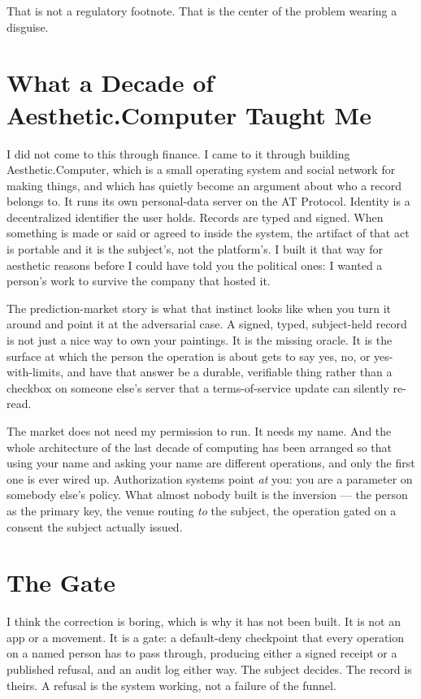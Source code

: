 \documentclass[11pt,letterpaper]{article}
\newcommand{\ac}{Aesthetic\textcolor{acpink}{.}Computer}
\begin{document}
That is not a regulatory footnote. That is the center of the problem wearing a disguise.

\section{What a Decade of \ac{} Taught Me}

I did not come to this through finance. I came to it through building \ac{}, which is a small operating system and social network for making things, and which has quietly become an argument about who a record belongs to. It runs its own personal-data server on the AT Protocol. Identity is a decentralized identifier the user holds. Records are typed and signed. When something is made or said or agreed to inside the system, the artifact of that act is portable and it is the subject's, not the platform's. I built it that way for aesthetic reasons before I could have told you the political ones: I wanted a person's work to survive the company that hosted it.

The prediction-market story is what that instinct looks like when you turn it around and point it at the adversarial case. A signed, typed, subject-held record is not just a nice way to own your paintings. It is the missing oracle. It is the surface at which the person the operation is about gets to say yes, no, or yes-with-limits, and have that answer be a durable, verifiable thing rather than a checkbox on someone else's server that a terms-of-service update can silently re-read.

The market does not need my permission to run. It needs my name. And the whole architecture of the last decade of computing has been arranged so that using your name and asking your name are different operations, and only the first one is ever wired up. Authorization systems point \textit{at} you: you are a parameter on somebody else's policy. What almost nobody built is the inversion --- the person as the primary key, the venue routing \textit{to} the subject, the operation gated on a consent the subject actually issued.

\section{The Gate}

I think the correction is boring, which is why it has not been built. It is not an app or a movement. It is a gate: a default-deny checkpoint that every operation on a named person has to pass through, producing either a signed receipt or a published refusal, and an audit log either way. The subject decides. The record is theirs. A refusal is the system working, not a failure of the funnel.
\end{document}
